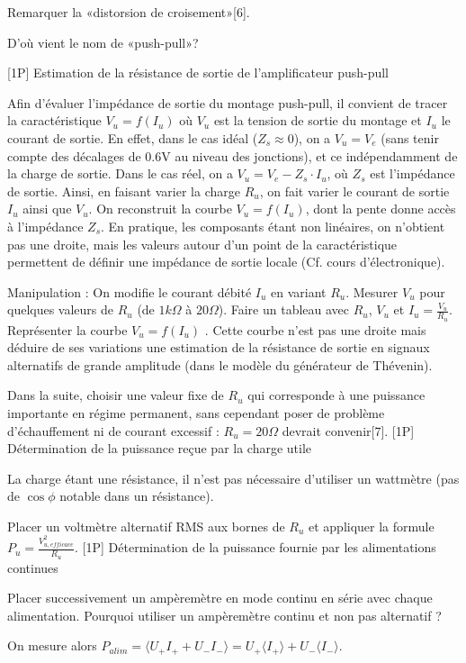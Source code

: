 \documentclass{article}%
\begin{document}
Remarquer la «distorsion de croisement»[6].

D'où vient le nom de «push-pull»?


[1P] Estimation de la résistance de sortie de l'amplificateur push-pull

Afin d'évaluer l'impédance de sortie du montage push-pull, il convient de tracer la caractéristique $V_u=f(I_u)$ où $V_u$ est la tension de sortie du montage et $I_u$ le courant de sortie. En effet, dans le cas idéal ($Z_s \approx 0$), on a $V_u=V_e$ (sans tenir compte des décalages de 0.6V au niveau des jonctions), et ce indépendamment de la charge de sortie. Dans le cas réel, on a $V_u=V_e-Z_s\cdot I_u$, où $Z_s$ est l'impédance de sortie. Ainsi, en faisant varier la charge $R_u$, on fait varier le courant de sortie $I_u$ ainsi que $V_u$. On reconstruit la courbe $V_u=f(I_u)$, dont la pente donne accès à l'impédance $Z_s$. En pratique, les composants étant non linéaires, on n'obtient pas une droite, mais les valeurs autour d'un point de la caractéristique permettent de définir une impédance de sortie locale (Cf. cours d'électronique).

Manipulation : On modifie le courant débité $I_u$ en variant $R_u$. Mesurer $V_u$ pour quelques valeurs de $R_u$ (de $1k\Omega$ à $20\Omega$). Faire un tableau avec $R_u$, $V_u$ et $I_u=\frac{V_u}{R_u}$. Représenter la courbe $V_u=f(I_u)$ . Cette courbe n'est pas une droite mais déduire de ses variations une estimation de la résistance de sortie en signaux alternatifs de grande amplitude (dans le modèle du générateur de Thévenin).


Dans la suite, choisir une valeur fixe de $R_{u}$ qui corresponde à une puissance importante en régime permanent, sans cependant poser de problème d'échauffement ni de courant excessif : $R_{u}=20 \Omega$ devrait convenir[7].
[1P] Détermination de la puissance reçue par la charge utile

La charge étant une résistance, il n'est pas nécessaire d'utiliser un wattmètre (pas de $\cos \phi$ notable dans un résistance).

Placer un voltmètre alternatif RMS aux bornes de $R_{u}$ et appliquer la formule $ P_{u} = \frac{V^2_{u,efficace}}{R_{u}}$.
[1P] Détermination de la puissance fournie par les alimentations continues

Placer successivement un ampèremètre en mode continu en série avec chaque alimentation. Pourquoi utiliser un ampèremètre continu et non pas alternatif ?

On mesure alors $P_{alim} = \langle{U_+I_+ + U_-I_-}\rangle = U_+ \langle{I_+}\rangle + U_-\langle{I_-}\rangle$.
\end{document}
